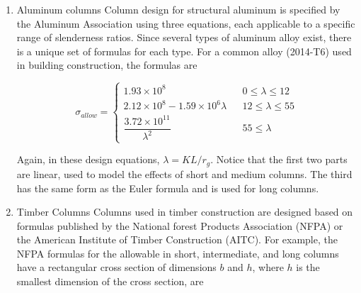 \documentclass[a4paper,openany,12pt]{book}
\begin{document}
{{\begin{enumerate}
 L2.5cm C2cm C2cm C2cm C2cm C2cm W section \& \(r_g\) (mm) \& \(A\) (mm\(^2\)) \&
Slenderness Ratio \& \(\sigma_{allow}\) (MPa) \& \(P_{allow}\) (kN)\\
W360 \(\times\) 39 \& 27.5 \& 4960 \& 218 \& -63 \& -314\\
W360 \(\times\) 45 \& 37.8 \& 5710 \& 159 \& 32 \& 183\\
W200 \(\times\) 36 \& 40.9 \& 4570 \& 147 \& 46 \& 211\\
W150 \(\times\) 22 \& 36.8 \& 2860 \& 163 \& 26.6 \& 76\\

At first, we find that our original choice W360 \(\times\) 39 does not
have the proper slenderness ratio (218 was higher than 200). So we pick
a next larger one, W360 \(\times\) 45, but find that it can support much
larger load than required. Subsequently, by process of elimination, we
find the lightest section that still support sufficient compressive load
is the W150 \(\times\) 22.

\item Aluminum columns
\label{aluminum-columns}
Column design for structural aluminum is specified by the Aluminum
Association using three equations, each applicable to a specific range
of slenderness ratios. Since several types of aluminum alloy exist,
there is a unique set of formulas for each type. For a common alloy
(2014-T6) used in building construction, the formulas are

$$\sigma_{allow} = \left\{
    \begin{array}{lcc}
      1.93 \times 10^8 &&  0 \leqslant \lambda \leqslant 12 \\[20pt] 
      2.12 \times 10^8 - 1.59 \times 10^6 \lambda && 12 \leqslant \lambda \leqslant 55 \\[20pt]
      \dfrac{3.72 \times 10^{11}}{ \lambda^2 } && 55 \leqslant \lambda 
    \end{array} \right.$$

Again, in these design equations, \(\lambda = KL/r_g\). Notice that the
first two parts are linear, used to model the effects of short and
medium columns. The third has the same form as the Euler formula and is
used for long columns.


\item Timber Columns
\label{timber-columns}
Columns used in timber construction are designed based on formulas
published by the National forest Products Association (NFPA) or the
American Institute of Timber Construction (AITC). For example, the NFPA
formulas for the allowable in short, intermediate, and long columns have
a rectangular cross section of dimensions \(b\) and \(h\), where \(h\) is the
smallest dimension of the cross section, are


\end{enumerate}}}
\end{document}
